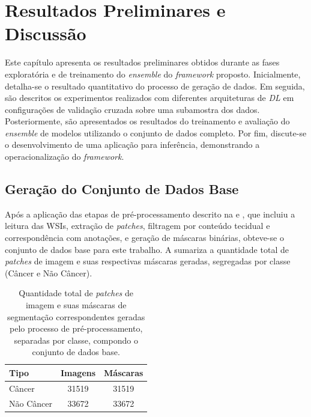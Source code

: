\chapter{Resultados Preliminares e Discussão}\label{chp:resultados_preliminares} 

Este capítulo apresenta os resultados preliminares obtidos durante as fases exploratória e de treinamento do \textit{ensemble} do \textit{framework} proposto. Inicialmente, detalha-se o resultado quantitativo do processo de geração de dados. Em seguida, são descritos os experimentos realizados com diferentes arquiteturas de \textit{DL} em configurações de validação cruzada sobre uma subamostra dos dados. Posteriormente, são apresentados os resultados do treinamento e avaliação do \textit{ensemble} de modelos utilizando o conjunto de dados completo. Por fim, discute-se o desenvolvimento de uma aplicação para inferência, demonstrando a operacionalização do \textit{framework}.

\section{Geração do Conjunto de Dados Base}\label{sec:res_dataset_base}

Após a aplicação das etapas de pré-processamento descrito na  e , que incluiu a leitura das WSIs, extração de \textit{patches}, filtragem por conteúdo tecidual e correspondência com anotações, e geração de máscaras binárias, obteve-se o conjunto de dados base para este trabalho. A  sumariza a quantidade total de \textit{patches} de imagem e suas respectivas máscaras geradas, segregadas por classe (Câncer e Não Câncer).

\begin{table}[!htb] 
    \centering 
    \caption[Distribuição Total de \textit{Patches} e Máscaras Gerados]{Quantidade total de \textit{patches} de imagem e suas máscaras de segmentação correspondentes geradas pelo processo de pré-processamento, separadas por classe, compondo o conjunto de dados base.} 
    \label{tab:distribuicao_patches_mascaras} 
    \begin{tabular}{l c c} 
        \toprule 
        \textbf{Tipo} & \textbf{Imagens} & \textbf{Máscaras} \\ 
        \midrule 
        Câncer      & 31519 & 31519 \\ 
        Não Câncer  & 33672 & 33672 \\ 
        \bottomrule 
    \end{tabular}
\end{table}

